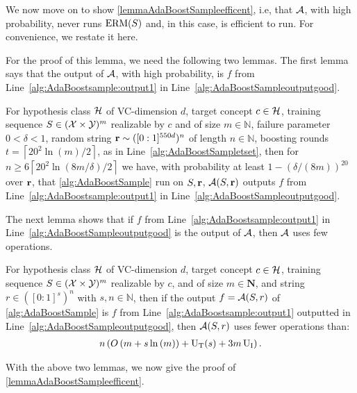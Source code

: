 We now move on to show \cref{lemmaAdaBoostSampleefficent}, i.e, that $ \mathcal{A} $, with high probability, never runs $ \mathrm{ERM}(S) $ and, in this case, is efficient to run. For convenience, we restate it here.  

\lemmaAdaBoostSampleefficent*

For the proof of this lemma, we need the following two lemmas.
The first lemma says that the output of $ \mathcal{A} $, with high probability, is $ f $ from Line~\ref{alg:AdaBoostsample:output1} in Line~\ref{alg:AdaBoostSampleoutputgood}.

\begin{lemma}\label{adaboostsamplefewroundslemma}
  For hypothesis class $\mathcal{H}$ of VC-dimension $d$, target concept $ c\in \mathcal{H} $, training sequence 
   $S\in(\mathcal{X}\times \mathcal{Y})^{m}$ realizable by $c$ and of size $m\in \mathbb{N}$, failure parameter $ 0<\delta <1$,  random string $\mathbf{r} \sim ([0:1]^{550d})^{n}$ of length $n\in\mathbb{N}$, boosting rounds $t=\left\lceil20^{2}\ln(m)/2\right\rceil$, as in Line~\ref{alg:AdaBoostSampletset}, then for  $n\geq 6\left\lceil20^{2}\ln{\left(8m/\delta \right)}/2\right\rceil$ we have, with probability at least $1-(\delta/(8m))^{20}$ over $ \mathbf{r} $, that \cref{alg:AdaBoostSample} run on $S,\mathbf{r}$, $\mathcal{A}(S,\mathbf{r})$ outputs $f$ from Line~\ref{alg:AdaBoostsample:output1} in Line~\ref{alg:AdaBoostSampleoutputgood}.
  \end{lemma}

The next lemma shows that if $ f $ from Line~\ref{alg:AdaBoostsample:output1} in Line~\ref{alg:AdaBoostSampleoutputgood} is the output of $ \mathcal{A} $, then $ \mathcal{A} $ uses few operations.   

\begin{lemma}\label{adaboostsampleruntime}
  For hypothesis class $\mathcal{H}$ of VC-dimension $d$, target concept $ c\in \mathcal{H} $, training sequence 
  $S\in(\mathcal{X}\times \mathcal{Y})^{m}$ realizable by $c$, and of size $m\in\mathbf{N}$, and string $r\in([0:1]^{s})^{n}$ with $s,n\in\mathbb{N}$, then if the output  $f=\mathcal{A}(S,r)$ of \cref{alg:AdaBoostSample} is $f$ from Line~\ref{alg:AdaBoostsample:output1} outputted in Line~\ref{alg:AdaBoostSampleoutputgood}, then $\mathcal{A}(S,r)$ uses fewer operations than: 
\begin{align*}
  n\left(O\left(m+s\ln{\left(m \right)}\right)+\operatorname{U_{T}}(s)+3m\operatorname{U_{I}}\right).
\end{align*}  
\end{lemma}

With the above two lemmas, we now give the proof of \cref{lemmaAdaBoostSampleefficent}.

